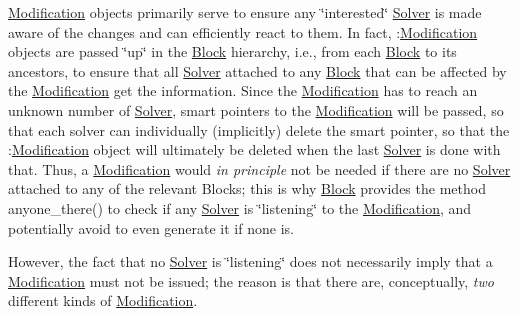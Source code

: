 \mbox{\hyperlink{class_s_m_spp__di__unipi__it_1_1_modification}{Modification}} objects primarily serve to ensure any \char`\"{}interested\char`\"{} \mbox{\hyperlink{class_s_m_spp__di__unipi__it_1_1_solver}{Solver}} is made aware of the changes and can efficiently react to them. In fact, \+:\mbox{\hyperlink{class_s_m_spp__di__unipi__it_1_1_modification}{Modification}} objects are passed \char`\"{}up\char`\"{} in the \mbox{\hyperlink{class_s_m_spp__di__unipi__it_1_1_block}{Block}} hierarchy, i.\+e., from each \mbox{\hyperlink{class_s_m_spp__di__unipi__it_1_1_block}{Block}} to its ancestors, to ensure that all \mbox{\hyperlink{class_s_m_spp__di__unipi__it_1_1_solver}{Solver}} attached to any \mbox{\hyperlink{class_s_m_spp__di__unipi__it_1_1_block}{Block}} that can be affected by the \mbox{\hyperlink{class_s_m_spp__di__unipi__it_1_1_modification}{Modification}} get the information. Since the \mbox{\hyperlink{class_s_m_spp__di__unipi__it_1_1_modification}{Modification}} has to reach an unknown number of \mbox{\hyperlink{class_s_m_spp__di__unipi__it_1_1_solver}{Solver}}, smart pointers to the \mbox{\hyperlink{class_s_m_spp__di__unipi__it_1_1_modification}{Modification}} will be passed, so that each solver can individually (implicitly) delete the smart pointer, so that the \+:\mbox{\hyperlink{class_s_m_spp__di__unipi__it_1_1_modification}{Modification}} object will ultimately be deleted when the last \mbox{\hyperlink{class_s_m_spp__di__unipi__it_1_1_solver}{Solver}} is done with that. Thus, a \mbox{\hyperlink{class_s_m_spp__di__unipi__it_1_1_modification}{Modification}} would {\itshape in principle} not be needed if there are no \mbox{\hyperlink{class_s_m_spp__di__unipi__it_1_1_solver}{Solver}} attached to any of the relevant Blocks; this is why \mbox{\hyperlink{class_s_m_spp__di__unipi__it_1_1_block}{Block}} provides the method anyone\+\_\+there() to check if any \mbox{\hyperlink{class_s_m_spp__di__unipi__it_1_1_solver}{Solver}} is \char`\"{}listening\char`\"{} to the \mbox{\hyperlink{class_s_m_spp__di__unipi__it_1_1_modification}{Modification}}, and potentially avoid to even generate it if none is.

However, the fact that no \mbox{\hyperlink{class_s_m_spp__di__unipi__it_1_1_solver}{Solver}} is \char`\"{}listening\char`\"{} does not necessarily imply that a \mbox{\hyperlink{class_s_m_spp__di__unipi__it_1_1_modification}{Modification}} must not be issued; the reason is that there are, conceptually, {\itshape two} different kinds of \mbox{\hyperlink{class_s_m_spp__di__unipi__it_1_1_modification}{Modification}}.


